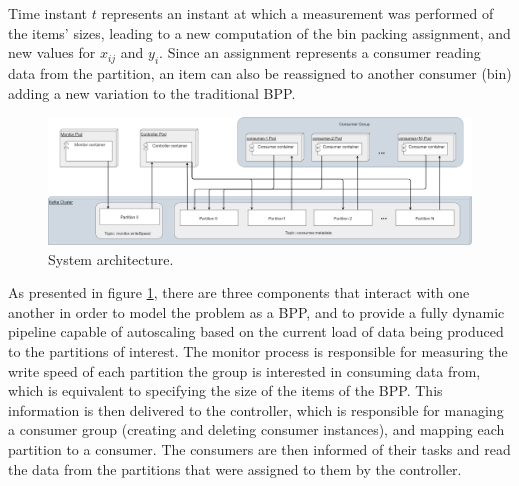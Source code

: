 Time instant $t$ represents an instant at which a measurement was performed of
the items' sizes, leading to a new computation of the bin packing assignment,
and new values for $x_{ij}$ and $y_i$. Since an assignment represents a
consumer reading data from the partition, an item can also be reassigned to
another consumer (bin) adding a new variation to the traditional BPP. 

\begin{figure}[htb!] \centering
    \includegraphics[width=\textwidth]{images/controller/System Design.png}
    \caption{System architecture.} 
    \label{fig:system_architecture}
\end{figure}

As presented in figure \ref{fig:system_architecture}, there are three components
that interact with one another in order to model the problem as a BPP, and to
provide a fully dynamic pipeline capable of autoscaling based on the current
load of data being produced to the partitions of interest. The monitor process
is responsible for measuring the write speed of each partition the group is
interested in consuming data from, which is equivalent to specifying the size of
the items of the BPP.  This information is then delivered to the controller,
which is responsible for managing a consumer group (creating and deleting
consumer instances), and mapping each partition to a consumer. The consumers are
then informed of their tasks and read the data from the partitions that were
assigned to them by the controller.

